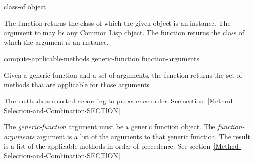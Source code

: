 \begin{defun}[Function]
class-of object

The function  returns the class of which
the given object is an instance.
The argument to  may be any Common Lisp object.
The function  returns the class of which
the argument is an instance.

\end{defun}


\begin{defun}[Function]
compute-applicable-methods generic-function function-arguments

Given a generic function and a set of arguments, the function
 returns the set of methods
that are applicable for those arguments.

The methods are
sorted according to precedence order.
See section~\ref{Method-Selection-and-Combination-SECTION}.





The {\it generic-function\/} argument must be a generic function object.
The {\it function-arguments\/} argument is a list of the arguments to
that generic function.
The result is a list of the applicable methods in order of precedence.
See section~\ref{Method-Selection-and-Combination-SECTION}.
\end{defun}


